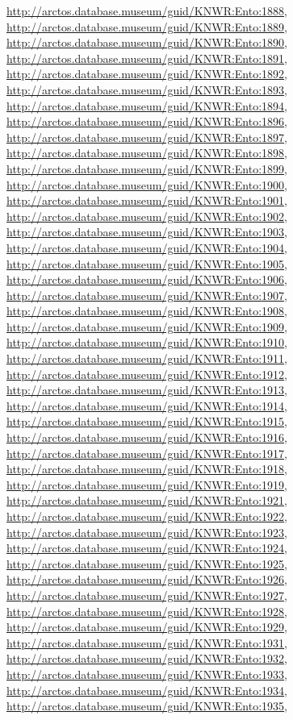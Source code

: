 \documentclass[9pt, article]{memoir}
\begin{document}
\begin{multicols}{2}
\url{http://arctos.database.museum/guid/KNWR:Ento:1888}, 
\url{http://arctos.database.museum/guid/KNWR:Ento:1889}, 
\url{http://arctos.database.museum/guid/KNWR:Ento:1890}, 
\url{http://arctos.database.museum/guid/KNWR:Ento:1891}, 
\url{http://arctos.database.museum/guid/KNWR:Ento:1892}, 
\url{http://arctos.database.museum/guid/KNWR:Ento:1893}, 
\url{http://arctos.database.museum/guid/KNWR:Ento:1894}, 
\url{http://arctos.database.museum/guid/KNWR:Ento:1896}, 
\url{http://arctos.database.museum/guid/KNWR:Ento:1897}, 
\url{http://arctos.database.museum/guid/KNWR:Ento:1898}, 
\url{http://arctos.database.museum/guid/KNWR:Ento:1899}, 
\url{http://arctos.database.museum/guid/KNWR:Ento:1900}, 
\url{http://arctos.database.museum/guid/KNWR:Ento:1901}, 
\url{http://arctos.database.museum/guid/KNWR:Ento:1902}, 
\url{http://arctos.database.museum/guid/KNWR:Ento:1903}, 
\url{http://arctos.database.museum/guid/KNWR:Ento:1904}, 
\url{http://arctos.database.museum/guid/KNWR:Ento:1905}, 
\url{http://arctos.database.museum/guid/KNWR:Ento:1906}, 
\url{http://arctos.database.museum/guid/KNWR:Ento:1907}, 
\url{http://arctos.database.museum/guid/KNWR:Ento:1908}, 
\url{http://arctos.database.museum/guid/KNWR:Ento:1909}, 
\url{http://arctos.database.museum/guid/KNWR:Ento:1910}, 
\url{http://arctos.database.museum/guid/KNWR:Ento:1911}, 
\url{http://arctos.database.museum/guid/KNWR:Ento:1912}, 
\url{http://arctos.database.museum/guid/KNWR:Ento:1913}, 
\url{http://arctos.database.museum/guid/KNWR:Ento:1914}, 
\url{http://arctos.database.museum/guid/KNWR:Ento:1915}, 
\url{http://arctos.database.museum/guid/KNWR:Ento:1916}, 
\url{http://arctos.database.museum/guid/KNWR:Ento:1917}, 
\url{http://arctos.database.museum/guid/KNWR:Ento:1918}, 
\url{http://arctos.database.museum/guid/KNWR:Ento:1919}, 
\url{http://arctos.database.museum/guid/KNWR:Ento:1921}, 
\url{http://arctos.database.museum/guid/KNWR:Ento:1922}, 
\url{http://arctos.database.museum/guid/KNWR:Ento:1923}, 
\url{http://arctos.database.museum/guid/KNWR:Ento:1924}, 
\url{http://arctos.database.museum/guid/KNWR:Ento:1925}, 
\url{http://arctos.database.museum/guid/KNWR:Ento:1926}, 
\url{http://arctos.database.museum/guid/KNWR:Ento:1927}, 
\url{http://arctos.database.museum/guid/KNWR:Ento:1928}, 
\url{http://arctos.database.museum/guid/KNWR:Ento:1929}, 
\url{http://arctos.database.museum/guid/KNWR:Ento:1931}, 
\url{http://arctos.database.museum/guid/KNWR:Ento:1932}, 
\url{http://arctos.database.museum/guid/KNWR:Ento:1933}, 
\url{http://arctos.database.museum/guid/KNWR:Ento:1934}, 
\url{http://arctos.database.museum/guid/KNWR:Ento:1935}, 

\end{multicols}
\end{document}
